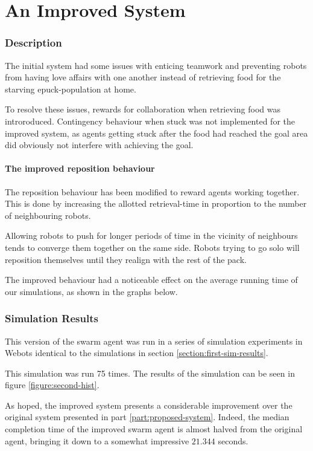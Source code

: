 \documentclass[a4paper]{article}
\begin{document}
\part{An Improved System}
\label{part:improved-system}

\section{Description}
The initial system had some issues with enticing teamwork and preventing robots from having love affairs with one another instead of retrieving food for the starving epuck-population at home.

To resolve these issues, rewards for collaboration when retrieving food was introroduced.
Contingency behaviour when stuck was not implemented for the improved system, as agents getting stuck after the food had reached the goal area did obviously not interfere with achieving the goal.

\subsection{The improved reposition behaviour}
The reposition behaviour has been modified to reward agents working together. This is done by increasing the allotted retrieval-time in proportion to the number of neighbouring robots.

Allowing robots to push for longer periods of time in the vicinity of neighbours tends to converge them together on the same side. Robots trying to go solo will reposition themselves until they realign with the rest of the pack.

The improved behaviour had a noticeable effect on the average running time of our simulations, as shown in the graphs below.

\section{Simulation Results}
This version of the swarm agent was run in a series of simulation experiments in Webots identical to the simulations in section \vref{section:first-sim-results}.

This simulation was run 75 times.
The results of the simulation can be seen in figure \vref{figure:second-hist}.

As hoped, the improved system presents a considerable improvement over the original system presented in part \vref{part:proposed-system}.
Indeed, the median completion time of the improved swarm agent is almost halved from the original agent, bringing it down to a somewhat impressive $ 21.344 $ seconds.
\end{document}
